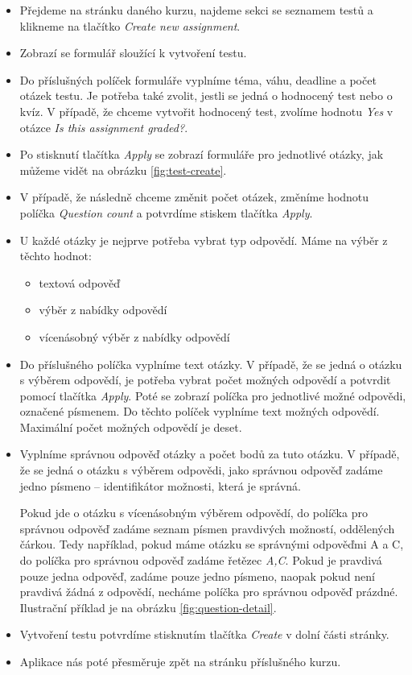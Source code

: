 \begin{itemize}
	\item Přejdeme na stránku daného kurzu, najdeme sekci se seznamem testů a klikneme na tlačítko \textit{Create new assignment}.
	\item Zobrazí se formulář sloužící k vytvoření testu. 
	\item Do příslušných políček formuláře vyplníme téma, váhu, deadline a počet otázek testu. Je potřeba také zvolit, jestli se jedná o hodnocený test nebo o kvíz. V případě, že chceme vytvořit hodnocený test, zvolíme hodnotu \textit{Yes} v otázce \textit{Is this assignment graded?}.
	\item Po stisknutí tlačítka \textit{Apply} se zobrazí formuláře pro jednotlivé otázky, jak můžeme vidět na obrázku \ref{fig:test-create}.
	\item V případě, že následně chceme změnit počet otázek, změníme hodnotu políčka \textit{Question count} a potvrdíme stiskem tlačítka \textit{Apply}.
	\item U každé otázky je nejprve potřeba vybrat typ odpovědí. Máme na výběr z těchto hodnot:
		\begin{itemize}
			\item textová odpověď
			\item výběr z nabídky odpovědí
			\item vícenásobný výběr z nabídky odpovědí
		\end{itemize}
	\item Do příslušného políčka vyplníme text otázky. V případě, že se jedná o otázku s výběrem odpovědí, je potřeba vybrat počet možných odpovědí a potvrdit pomocí tlačítka \textit{Apply}. Poté se zobrazí políčka pro jednotlivé možné odpovědi, označené písmenem. Do těchto políček vyplníme text možných odpovědí. Maximální počet možných odpovědí je deset.
	\item Vyplníme správnou odpověď otázky a počet bodů za tuto otázku. V případě, že se jedná o otázku s výběrem odpovědi, jako správnou odpověď zadáme jedno písmeno -- identifikátor možnosti, která je správná. 
	
	Pokud jde o otázku s vícenásobným výběrem odpovědí, do políčka pro správnou odpověď zadáme seznam písmen pravdivých možností, oddělených čárkou. Tedy například, pokud máme otázku se správnými odpověďmi A a C, do políčka pro správnou odpověď zadáme řetězec \textit{A,C}. Pokud je pravdivá pouze jedna odpověď, zadáme pouze jedno písmeno, naopak pokud není pravdivá žádná z odpovědí, necháme políčka pro správnou odpověď prázdné. Ilustrační příklad je na obrázku \ref{fig:question-detail}.
	\item Vytvoření testu potvrdíme stisknutím tlačítka \textit{Create} v dolní části stránky.
	\item Aplikace nás poté přesměruje zpět na stránku příslušného kurzu.
\end{itemize}

